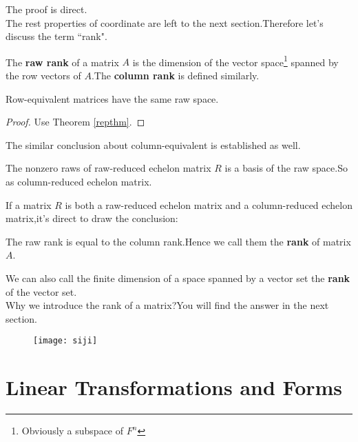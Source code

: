 \documentclass{article}
\begin{document}
The proof is direct.\\
\indent The rest properties of coordinate are left to the next section.Therefore let's discuss the term ``rank".
\begin{dde}
	The \textbf{raw rank} of a matrix $A$ is the dimension of the vector space\footnote{Obviously a subspace of $F^n$} spanned by the row vectors of $A$.The \textbf{column rank} is defined similarly.
\end{dde}
\begin{thm}
	Row-equivalent matrices have the same raw space. 
\end{thm}
\begin{proof}
	Use Theorem \ref{repthm}.
\end{proof}
The similar conclusion about column-equivalent is established as well.
\begin{thm}
	The nonzero raws of raw-reduced echelon matrix $R$ is a basis of the raw space.So as column-reduced echelon matrix.
\end{thm}
If a matrix $R$ is both a raw-reduced echelon matrix and a column-reduced echelon matrix,it's direct to draw the conclusion:
\begin{thm}
	The raw rank is equal to the column rank.Hence we call them the \textbf{rank} of matrix $A$.
\end{thm}
We can also call the finite dimension of a space spanned by a vector set the \textbf{rank} of the vector set.\\
\indent Why we introduce the rank of a matrix?You will find the answer in the next section.
\begin{figure}[htbp]
	\centering
	\texttt{[image: siji]}
\end{figure}
\newpage
\section{Linear Transformations and Forms}\label{3}
\end{document}
